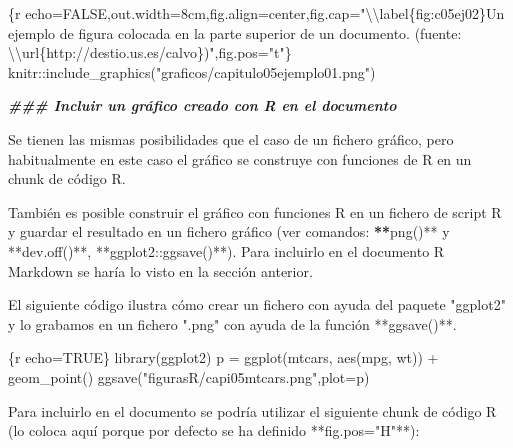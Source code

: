 \documentclass[11pt,a4paper,oneside,]{article}
\newenvironment{Shaded}{\begin{snugshade}}{\end{snugshade}}
\newcommand{\AttributeTok}[1]{\textcolor[rgb]{0.77,0.63,0.00}{#1}}
\newcommand{\DocumentationTok}[1]{\textcolor[rgb]{0.56,0.35,0.01}{\textbf{\textit{#1}}}}
\newcommand{\ErrorTok}[1]{\textcolor[rgb]{0.64,0.00,0.00}{\textbf{#1}}}
\newcommand{\FunctionTok}[1]{\textcolor[rgb]{0.00,0.00,0.00}{#1}}
\newcommand{\NormalTok}[1]{#1}
\newcommand{\SpecialCharTok}[1]{\textcolor[rgb]{0.00,0.00,0.00}{#1}}
\newcommand{\StringTok}[1]{\textcolor[rgb]{0.31,0.60,0.02}{#1}}
\numberwithin{dummy}{section}
\theoremstyle{ocrenumbox}
\theoremstyle{blacknumex}
\theoremstyle{blacknumbox}
\theoremstyle{ocrenum}
\theoremstyle{ocrenum}
\begin{document}
\begin{Shaded}
\begin{Highlighting}[numbers=left,,]
\StringTok{\textasciigrave{}\textasciigrave{}\textasciigrave{}}\AttributeTok{\{r echo=FALSE,out.width=\textquotesingle{}8cm\textquotesingle{},fig.align=\textquotesingle{}center\textquotesingle{},fig.cap="}\SpecialCharTok{\textbackslash{}\textbackslash{}}\AttributeTok{label\{fig:c05ej02\}Un ejemplo de figura colocada en la parte superior de un documento. (fuente: }\SpecialCharTok{\textbackslash{}\textbackslash{}}\AttributeTok{url\{http://destio.us.es/calvo\})",fig.pos="t"\}}
\AttributeTok{knitr::include\_graphics("graficos/capitulo05ejemplo01.png")}
\StringTok{\textasciigrave{}\textasciigrave{}\textasciigrave{}}



\DocumentationTok{\#\#\# Incluir un gráfico creado con R en el documento}


\NormalTok{Se tienen las mismas posibilidades que el caso de un fichero gráfico, pero habitualmente en este caso el gráfico se construye con funciones de R en un chunk de código R. }

\NormalTok{También es posible construir el gráfico con funciones R en un fichero de script R y guardar el resultado en un fichero gráfico (ver comandos}\SpecialCharTok{:} \ErrorTok{**}\StringTok{\textasciigrave{}}\AttributeTok{png()}\StringTok{\textasciigrave{}}\SpecialCharTok{**}\NormalTok{ y }\SpecialCharTok{**}\StringTok{\textasciigrave{}}\AttributeTok{dev.off()}\StringTok{\textasciigrave{}}\SpecialCharTok{**}\NormalTok{, }\SpecialCharTok{**}\StringTok{\textasciigrave{}}\AttributeTok{ggplot2::ggsave()}\StringTok{\textasciigrave{}}\SpecialCharTok{**}\NormalTok{). Para incluirlo en el documento R Markdown se haría lo visto en la sección anterior.}

\NormalTok{El siguiente código ilustra cómo crear un fichero con ayuda del paquete }\StringTok{"ggplot2"}\NormalTok{ y lo grabamos en un fichero }\StringTok{".png"}\NormalTok{ con ayuda de la función }\SpecialCharTok{**}\StringTok{\textasciigrave{}}\AttributeTok{ggsave()}\StringTok{\textasciigrave{}}\SpecialCharTok{**}\NormalTok{.}

\StringTok{\textasciigrave{}\textasciigrave{}\textasciigrave{}}\AttributeTok{\{r echo=TRUE\}}
\AttributeTok{library(ggplot2)}
\AttributeTok{p = ggplot(mtcars, aes(mpg, wt)) + }
\AttributeTok{  geom\_point()}
\AttributeTok{ggsave("figurasR/capi05mtcars.png",plot=p)}
\StringTok{\textasciigrave{}\textasciigrave{}\textasciigrave{}}


\NormalTok{Para incluirlo en el documento se podría utilizar el siguiente chunk de código }\FunctionTok{R}\NormalTok{ (lo coloca aquí porque por defecto se ha definido }\SpecialCharTok{**}\StringTok{\textasciigrave{}}\AttributeTok{fig.pos="H"}\StringTok{\textasciigrave{}}\SpecialCharTok{**}\NormalTok{)}\SpecialCharTok{:} 


\end{Highlighting}
\end{Shaded}
\end{document}
